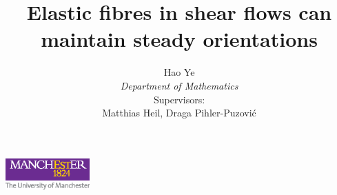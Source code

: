\documentclass{beamer}
\title{\fontsize{14pt}{12pt}\selectfont Elastic fibres in shear flows can maintain steady orientations}
\author{
	Hao Ye \\ \textit{Department of Mathematics} \\
	\vspace{0.5cm} 
	Supervisors: \\Matthias Heil, Draga Pihler-Puzović
}
\begin{document}
\begin{frame}[plain] 
	\maketitle 
	
	
	\begin{center}
		\includegraphics[height=1.2cm]{plots/TAB_col_white_background.eps} 
	\end{center}
\end{frame}



\end{document}

